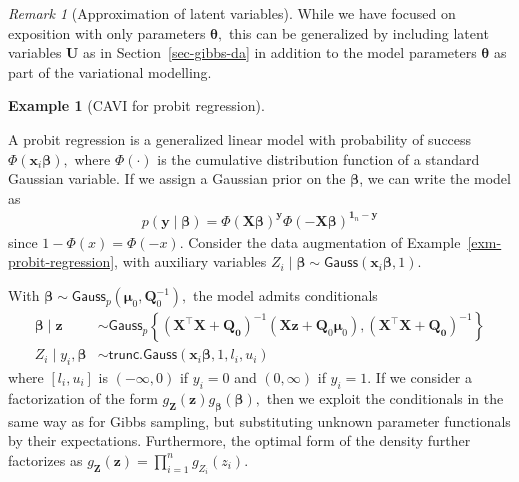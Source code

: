 \documentclass[
  11pt,
  letterpaper,
]{scrbook}
\theoremstyle{plain}
\theoremstyle{plain}
\theoremstyle{plain}
\theoremstyle{definition}
\theoremstyle{definition}
\newtheorem{example}{Example}[chapter]
\theoremstyle{definition}
\theoremstyle{remark}
\newtheorem{refremark}{Remark}[chapter]
\begin{document}
\begin{refremark}[Approximation of latent variables]
While we have focused on exposition with only parameters
\(\boldsymbol{\theta},\) this can be generalized by including latent
variables \(\boldsymbol{U}\) as in Section~\ref{sec-gibbs-da} in
addition to the model parameters \(\boldsymbol{\theta}\) as part of the
variational modelling.

\label{rem-approximation-latent}

\end{refremark}

\begin{example}[CAVI for probit
regression]\protect\hypertarget{exm-probit-reg-cavi}{}\label{exm-probit-reg-cavi}

A probit regression is a generalized linear model with probability of
success \(\Phi(\mathbf{x}_i\boldsymbol{\beta}),\) where \(\Phi(\cdot)\)
is the cumulative distribution function of a standard Gaussian variable.
If we assign a Gaussian prior on the \(\boldsymbol{\beta}\), we can
write the model as \begin{align*}
p(\boldsymbol{y} \mid \boldsymbol{\beta}) = \Phi(\mathbf{X}\boldsymbol{\beta})^{\boldsymbol{y}}\Phi(-\mathbf{X}\boldsymbol{\beta})^{\boldsymbol{1}_n -\boldsymbol{y}}
\end{align*} since \(1-\Phi(x) = \Phi(-x).\) Consider the data
augmentation of Example~\ref{exm-probit-regression}, with auxiliary
variables
\(Z_i \mid \boldsymbol{\beta}\sim \mathsf{Gauss}(\mathbf{x}_i\boldsymbol{\beta}, 1).\)

With
\(\boldsymbol{\beta} \sim \mathsf{Gauss}_p(\boldsymbol{\mu}_0, \mathbf{Q}_0^{-1}),\)
the model admits conditionals \begin{align*}
\boldsymbol{\beta} \mid \boldsymbol{z} &\sim \mathsf{Gauss}_p\left\{(\mathbf{X}^\top\mathbf{X} + \mathbf{Q_0})^{-1}(\mathbf{X}\boldsymbol{z} + \mathbf{Q}_0\boldsymbol{\mu}_0),  (\mathbf{X}^\top\mathbf{X} + \mathbf{Q_0})^{-1} \right\}
\\
Z_i \mid y_i, \boldsymbol{\beta} &\sim \mathsf{trunc. Gauss}(\mathbf{x}_i\boldsymbol{\beta}, 1, l_i, u_i) 
\end{align*} where \([l_i, u_i]\) is \((-\infty,0)\) if \(y_i=0\) and
\((0, \infty)\) if \(y_i=1.\) If we consider a factorization of the form
\(g_{\boldsymbol{Z}}(\boldsymbol{z})g_{\boldsymbol{\beta}}(\boldsymbol{\beta}),\)
then we exploit the conditionals in the same way as for Gibbs sampling,
but substituting unknown parameter functionals by their expectations.
Furthermore, the optimal form of the density further factorizes as
\(g_{\boldsymbol{Z}}(\boldsymbol{z}) = \prod_{i=1}^n g_{Z_i}(z_i).\)


\end{example}
\end{document}
